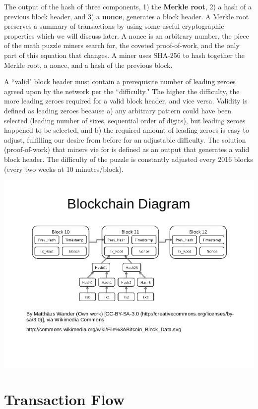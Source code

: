 \documentclass[full.tex]{subfiles}
\begin{document}
    The output of the hash of three components, 1) the \textbf{Merkle root}, 2) a hash of a previous block header, and 3) a \textbf{nonce}, generates a block header. A Merkle root preserves a summary of transactions by using some useful cryptographic properties which we will discuss later. A nonce is an arbitrary number, the piece of the math puzzle miners search for, the coveted proof-of-work, and the only part of this equation that changes. A miner uses SHA-256 to hash together the Merkle root, a nonce, and a hash of the previous block. 
    
    A ``valid" block header must contain a prerequisite number of leading zeroes agreed upon by the network per the ``difficulty." The higher the difficulty, the more leading zeroes required for a valid block header, and vice versa. Validity is defined as leading zeroes because a) any arbitrary pattern could have been selected (leading number of sixes, sequential order of digits), but leading zeroes happened to be selected, and b) the required amount of leading zeroes is easy to adjust, fulfilling our desire from before for an adjustable difficulty. The solution (proof-of-work) that miners vie for is defined as an output that generates a valid block header. The difficulty of the puzzle is constantly adjusted every 2016 blocks (every two weeks at 10 minutes/block).
    
   \includegraphics[scale=0.65]{blockchain_diagram}
   
   \section*{Transaction Flow}
   
\end{document}
